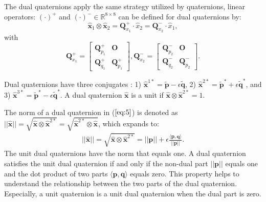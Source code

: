 \documentclass[micromachines,article,accept,pdftex,moreauthors]{Definitions/mdpi}
\begin{document}
The dual quaternions apply the same strategy utilized by quaternions, linear operators: $(\cdot)^{+}$ and $(\cdot)^{-} \in \mathbb{R}^{8 \times 8}$ can be defined for dual quaternions by:
\begin{equation*}
\widehat{\boldsymbol{x}}_{1} \otimes \widehat{\boldsymbol{x}}_{2} = \boldsymbol{Q}_{{x}_1}^{+} \cdot \widehat{{x}}_{2} = \boldsymbol{Q}_{{x}_2}^{-} \cdot \widehat{{x}}_{1},
\end{equation*}
with
\begin{equation*}
\boldsymbol{Q}_{{x}_1}^{+} = 
    \left[\begin{array}{cc}
        \boldsymbol{Q}_{p_1}^{+} & \boldsymbol{O} \\
        \boldsymbol{Q}_{q_1}^{+} & \boldsymbol{Q}_{p_1}^{+}
    \end{array}\right],
\boldsymbol{Q}_{{x}_2}^{-} = 
    \left[\begin{array}{cc}
        \boldsymbol{Q}_{p_2}^{-} & \boldsymbol{O} \\
        \boldsymbol{Q}_{q_2}^{-} & \boldsymbol{Q}_{p_2}^{-}
        \end{array}\right].
\end{equation*}

Dual quaternions have three conjugates \cite{fanDecentralizedRecursiveIdentification2017}: 1) $\widehat{\boldsymbol{x}}^{1*} = \widetilde{\boldsymbol{p}} - \epsilon \widetilde{\boldsymbol{q}}$, 2) $\widehat{\boldsymbol{x}}^{2*} = \widetilde{\boldsymbol{p}}^{*} + \epsilon \widetilde{\boldsymbol{q}}^{*}$, and 3) $\widehat{\boldsymbol{x}}^{3*} = \widetilde{\boldsymbol{p}}^{*} - \epsilon \widetilde{\boldsymbol{q}}^{*}$. A dual quaternion $\widehat{\boldsymbol{x}}$ is a unit if $\widehat{\boldsymbol{x}} \otimes \widehat{\boldsymbol{x}}^{2*} = 1$.

The norm of a dual quaternion in ($\ref{eq:5}$) is denoted as $||\widehat{\boldsymbol{x}}|| = \sqrt{\widehat{\boldsymbol{x}} \otimes \widehat{\boldsymbol{x}}^{2*}} = \sqrt{\widehat{\boldsymbol{x}}^{2*} \otimes \widehat{\boldsymbol{x}}}$, which expands to:
\begin{align*}
    ||\widehat{\boldsymbol{x}}|| = \sqrt{\widehat{\boldsymbol{x}} \otimes \widehat{\boldsymbol{x}}^{2*}} = ||\boldsymbol{p}|| + \epsilon{\frac{ \langle \boldsymbol{p},\boldsymbol{q} \rangle}{||\boldsymbol{p}||}}.
\end{align*}
The unit dual quaternions have the norm that equals one. A dual quaternion satisfies the unit dual quaternion if and only if the non-dual part $||\boldsymbol{p}||$ equals one and the dot product of two parts $\langle\boldsymbol{p},\boldsymbol{q}\rangle$ equals zero. This property helps to understand the relationship between the two parts of the dual quaternion. Especially, a unit quaternion is a unit dual quaternion when the dual part is zero.
\end{document}
